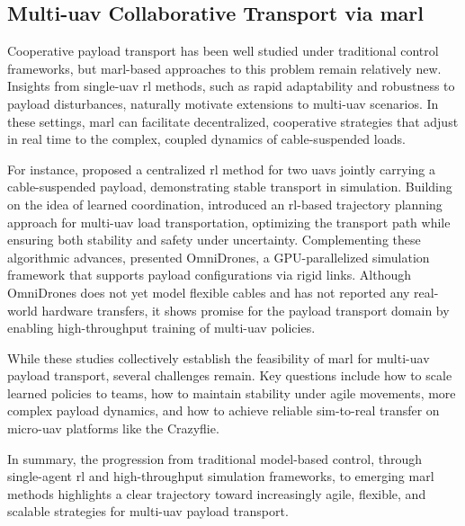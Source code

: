 \subsection{Multi-\gls{uav} Collaborative Transport via \gls{marl}}
Cooperative payload transport has been well studied under traditional control frameworks, but \gls{marl}-based approaches to this problem remain relatively new. Insights from single-\gls{uav} \gls{rl} methods, such as rapid adaptability and robustness to payload disturbances, naturally motivate extensions to multi-\gls{uav} scenarios. In these settings, \gls{marl} can facilitate decentralized, cooperative strategies that adjust in real time to the complex, coupled dynamics of cable-suspended loads.

For instance, \cite{Lin2024PayloadTW} proposed a centralized \gls{rl} method for two \glspl{uav} jointly carrying a cable-suspended payload, demonstrating stable transport in simulation. Building on the idea of learned coordination, \cite{Estevez2024Reinforcement} introduced an \gls{rl}-based trajectory planning approach for multi-\gls{uav} load transportation, optimizing the transport path while ensuring both stability and safety under uncertainty. Complementing these algorithmic advances, \cite{xu_omnidrones_2024} presented OmniDrones, a GPU-parallelized simulation framework that supports payload configurations via rigid links. Although OmniDrones does not yet model flexible cables and has not reported any real-world hardware transfers, it shows promise for the payload transport domain by enabling high-throughput training of multi-\gls{uav} policies.

While these studies collectively establish the feasibility of \gls{marl} for multi-\gls{uav} payload transport, several challenges remain. Key questions include how to scale learned policies to teams, how to maintain stability under agile movements, more complex payload dynamics, and how to achieve reliable sim-to-real transfer on micro-\gls{uav} platforms like the Crazyflie.

In summary, the progression from traditional model-based control, through single-agent \gls{rl} and high-throughput simulation frameworks, to emerging \gls{marl} methods highlights a clear trajectory toward increasingly agile, flexible, and scalable strategies for multi-\gls{uav} payload transport.